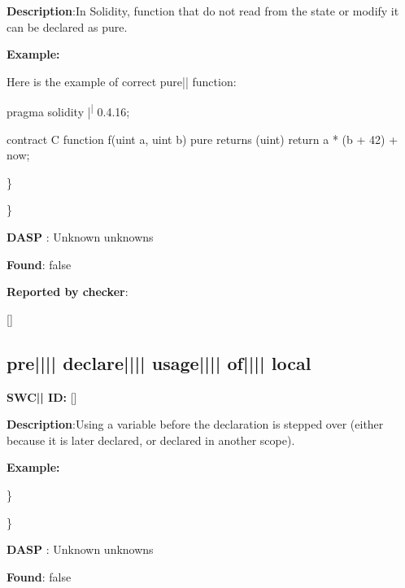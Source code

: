 \documentclass{article}
\begin{document}
\textbf{Description}:In Solidity, function that do not read from the state or modify it can be declared as pure.


\textbf{Example:} 
\begin{ffcode} 

Here is the example of correct pure|\textendash| function:

pragma solidity |\textsuperscript| 0.4.16;

contract C {
    function f(uint a, uint b) pure returns (uint) {
        return a * (b + 42) + now;
    }
}

\end{ffcode} 
\} 

\} 

\textbf{DASP} : Unknown unknowns

\textbf{Found}: false

\textbf{Reported by checker}: 
\begin{ffcode} 

[]
\end{ffcode} 
\subsection{pre{||\textunderscore|| }declare{||\textunderscore|| }usage{||\textunderscore|| }of{||\textunderscore|| }local} 
\textbf{SWC{|\textunderscore| }ID:} []

\textbf{Description}:Using a variable before the declaration is stepped over (either because it is later declared, or declared in another scope).


\textbf{Example:} 
\} 

\} 

\textbf{DASP} : Unknown unknowns

\textbf{Found}: false
\end{document}
